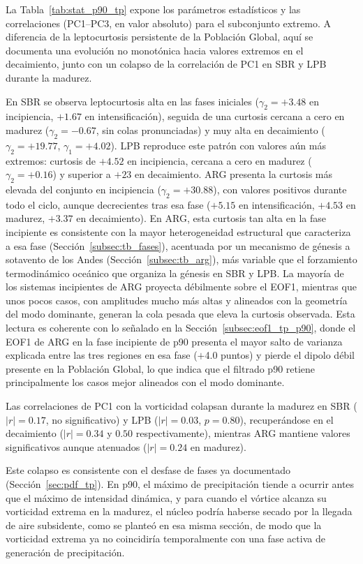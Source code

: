 La Tabla~\ref{tab:stat_p90_tp} expone los parámetros estadísticos y las correlaciones (PC1--PC3, en valor absoluto) para el subconjunto extremo. A diferencia de la leptocurtosis persistente de la Población Global, aquí se documenta una evolución no monotónica hacia valores extremos en el decaimiento, junto con un colapso de la correlación de PC1 en SBR y LPB durante la madurez.

En SBR se observa leptocurtosis alta en las fases iniciales ($\gamma_2 = +3.48$ en incipiencia, $+1.67$ en intensificación), seguida de una curtosis cercana a cero en madurez ($\gamma_2 = -0.67$, sin colas pronunciadas) y muy alta en decaimiento ($\gamma_2 = +19.77$, $\gamma_1 = +4.02$). LPB reproduce este patrón con valores aún más extremos: curtosis de $+4.52$ en incipiencia, cercana a cero en madurez ($\gamma_2 = +0.16$) y superior a $+23$ en decaimiento. ARG presenta la curtosis más elevada del conjunto en incipiencia ($\gamma_2 = +30.88$), con valores positivos durante todo el ciclo, aunque decrecientes tras esa fase ($+5.15$ en intensificación, $+4.53$ en madurez, $+3.37$ en decaimiento). En ARG, esta curtosis tan alta en la fase incipiente es consistente con la mayor heterogeneidad estructural que caracteriza a esa fase (Sección~\ref{subsec:tb_fases}), acentuada por un mecanismo de génesis a sotavento de los Andes (Sección~\ref{subsec:tb_arg}), más variable que el forzamiento termodinámico oceánico que organiza la génesis en SBR y LPB. La mayoría de los sistemas incipientes de ARG proyecta débilmente sobre el EOF1, mientras que unos pocos casos, con amplitudes mucho más altas y alineados con la geometría del modo dominante, generan la cola pesada que eleva la curtosis observada. Esta lectura es coherente con lo señalado en la Sección~\ref{subsec:eof1_tp_p90}, donde el EOF1 de ARG en la fase incipiente de p90 presenta el mayor salto de varianza explicada entre las tres regiones en esa fase ($+$4.0 puntos) y pierde el dipolo débil presente en la Población Global, lo que indica que el filtrado p90 retiene principalmente los casos mejor alineados con el modo dominante.

Las correlaciones de PC1 con la vorticidad colapsan durante la madurez en SBR ($|r|=0.17$, no significativo) y LPB ($|r|=0.03$, $p = 0.80$), recuperándose en el decaimiento ($|r|=0.34$ y $0.50$ respectivamente), mientras ARG mantiene valores significativos aunque atenuados ($|r|=0.24$ en madurez).

Este colapso es consistente con el desfase de fases ya documentado (Sección~\ref{sec:pdf_tp}). En p90, el máximo de precipitación tiende a ocurrir antes que el máximo de intensidad dinámica, y para cuando el vórtice alcanza su vorticidad extrema en la madurez, el núcleo podría haberse secado por la llegada de aire subsidente, como se planteó en esa misma sección, de modo que la vorticidad extrema ya no coincidiría temporalmente con una fase activa de generación de precipitación.

